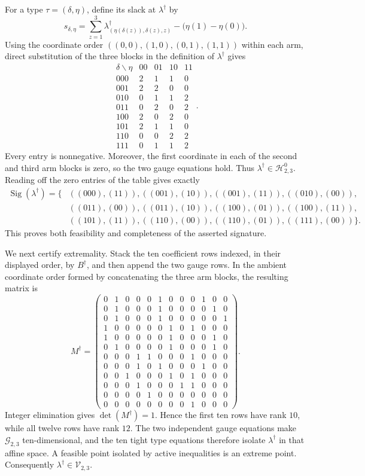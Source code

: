 For a type \(\tau=(\delta,\eta)\), define its slack at \(\lambda^\dagger\) by
\[
s_{\delta,\eta}=\sum_{z=1}^{3}\lambda^\dagger_{(\eta(\delta(z)),\delta(z),z)}-\bigl(\eta(1)-\eta(0)\bigr).
\]
Using the coordinate order \(((0,0),(1,0),(0,1),(1,1))\) within each arm, direct substitution of the three blocks in the definition of \(\lambda^\dagger\) gives
\[
\begin{array}{c|rrrr}
\delta\backslash\eta&00&01&10&11\\ \hline
000&2&1&1&0\\
001&2&2&0&0\\
010&0&1&1&2\\
011&0&2&0&2\\
100&2&0&2&0\\
101&2&1&1&0\\
110&0&0&2&2\\
111&0&1&1&2
\end{array}.
\]
Every entry is nonnegative. Moreover, the first coordinate in each of the second and third arm blocks is zero, so the two gauge equations hold. Thus \(\lambda^\dagger\in\mathcal H^0_{2,3}\). Reading off the zero entries of the table gives exactly
\[
\begin{split}
\operatorname{Sig}(\lambda^\dagger)=\{&((000),(11)),((001),(10)),((001),(11)),((010),(00)),\\
&((011),(00)),((011),(10)),((100),(01)),((100),(11)),\\
&((101),(11)),((110),(00)),((110),(01)),((111),(00))\}.
\end{split}
\]
This proves both feasibility and completeness of the asserted signature.

We next certify extremality. Stack the ten coefficient rows indexed, in their displayed order, by \(B^\dagger\), and then append the two gauge rows. In the ambient coordinate order formed by concatenating the three arm blocks, the resulting matrix is
\[
M^\dagger=\left(\begin{array}{rrrrrrrrrrrr}
0&1&0&0&0&1&0&0&0&1&0&0\\
0&1&0&0&0&1&0&0&0&0&1&0\\
0&1&0&0&0&1&0&0&0&0&0&1\\
1&0&0&0&0&0&1&0&1&0&0&0\\
1&0&0&0&0&0&1&0&0&0&1&0\\
0&1&0&0&0&0&1&0&0&0&1&0\\
0&0&0&1&1&0&0&0&1&0&0&0\\
0&0&0&1&0&1&0&0&0&1&0&0\\
0&0&1&0&0&0&1&0&1&0&0&0\\
0&0&0&1&0&0&0&1&1&0&0&0\\
0&0&0&0&1&0&0&0&0&0&0&0\\
0&0&0&0&0&0&0&0&1&0&0&0
\end{array}\right).
\]
Integer elimination gives \(\det(M^\dagger)=1\). Hence the first ten rows have rank \(10\), while all twelve rows have rank \(12\). The two independent gauge equations make \(\mathcal G_{2,3}\) ten-dimensional, and the ten tight type equations therefore isolate \(\lambda^\dagger\) in that affine space. A feasible point isolated by active inequalities is an extreme point. Consequently \(\lambda^\dagger\in\mathcal V_{2,3}\).

